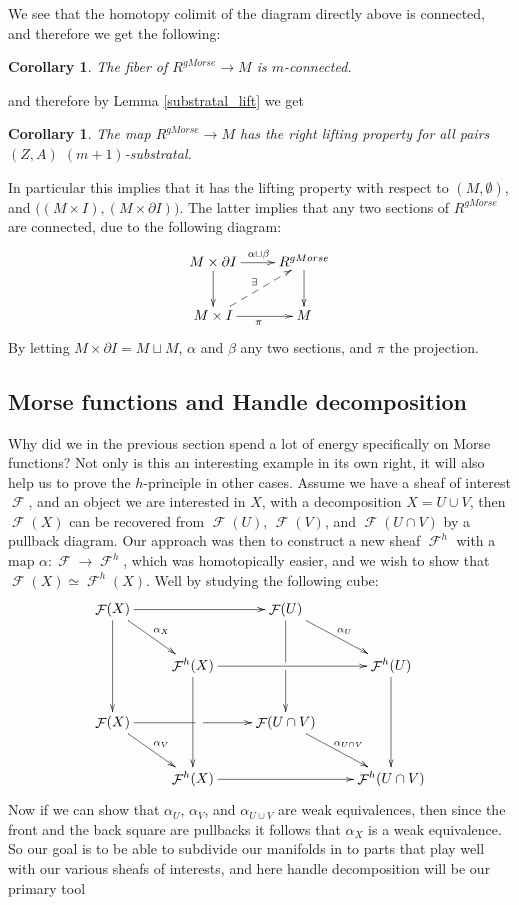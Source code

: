 \documentclass{article}
\newtheorem{corollary}[theorem]{Corollary}
\newtheorem{proposed work}[theorem]{Proposed Work}
\theoremstyle{definition}
\DeclareMathOperator{\CF}{\mathcal F}
\newcommand{\xymat}[1]{\begin{align*}\xymatrix{ #1}\end{align*}}
\begin{document}
We see that the homotopy colimit of the diagram directly above is connected, and therefore we get the following:
\begin{corollary}
The fiber of $R^{gMorse}\to M$ is $m$-connected.
\end{corollary}
and therefore by Lemma \ref{substratal_lift} we get
\begin{corollary}
The map $R^{gMorse}\to M$ has the right lifting property for all pairs $(Z,A)$ $(m+1)$-substratal.
\end{corollary}
In particular this implies that it has the lifting property with respect to $(M,\emptyset)$, and $\big((M\times I),(M\times \partial I) \big)$. The latter implies that any two sections of $R^{gMorse}$ are connected, due to the following diagram:
\xymat{M\times \partial I \ar[r]^{\alpha \sqcup \beta} \ar[d] & R^{gMorse}  \ar[d] \\
M\times I \ar[r]_\pi \ar@{-->}[ur]^{\exists}& M}
By letting $M\times \partial I=M\sqcup M$, $\alpha$ and $\beta$ any two sections, and $\pi$ the projection.

\subsection{Morse functions and Handle decomposition}
Why did we in the previous section spend a lot of energy specifically on Morse functions? Not only is this an interesting example in its own right, it will also help us to prove the $h$-principle in other cases. Assume we have a sheaf of interest $\CF$, and an object we are interested in $X$, with a decomposition $X=U\cup V$, then $\CF (X)$ can be recovered from $\CF (U)$, $\CF (V)$, and $\CF (U\cap V)$ by a pullback diagram. Our approach was then to construct a new sheaf $\CF^h$ with a map $\alpha: \CF\to \CF^h$, which was homotopically easier, and we wish to show that $\CF(X)\simeq \CF^h(X)$. Well by studying the following cube:
\xymat{\CF(X) \ar[rr] \ar[dd] \ar[dr]^{\alpha_X} && \CF(U) \ar[dd]|\hole \ar[dr]^{\alpha_U} & \\
&\CF^h(X) \ar[rr] \ar[dd] && \CF^h(U) \ar[dd] \\
\CF(X) \ar[rr]|\hole \ar[dr]^{\alpha_V} && \CF(U\cap V)  \ar[dr]^{\alpha_{U\cap V}} & \\
&\CF^h(X) \ar[rr] && \CF^h(U\cap V)   }
Now if we can show that $\alpha_U$, $\alpha_{V}$, and $\alpha_{U\cup V}$ are weak equivalences, then since the front and the back square are pullbacks it follows that $\alpha_X$ is a weak equivalence. So our goal is to be able to subdivide our manifolds in to parts that play well with our various sheafs of interests, and here handle decomposition will be our primary tool
\end{document}
